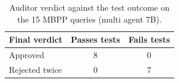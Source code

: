 \begin{table}[!tb]
\centering
\caption{Auditor verdict against the test outcome on the 15 MBPP queries (multi agent 7B).}
\label{tab:detector}
\small
\begin{tabular}{lcc}
\toprule
Final verdict & Passes tests & Fails tests \\
\midrule
Approved & 8 & 0 \\
Rejected twice & 0 & 7 \\
\bottomrule
\end{tabular}
\end{table}

